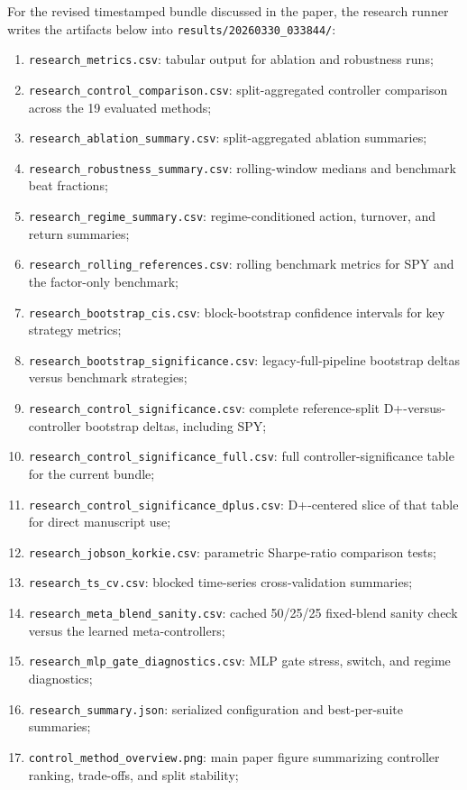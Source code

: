 \documentclass[11pt]{article}
\begin{document}
For the revised timestamped bundle discussed in the paper, the research runner
writes the artifacts below into \texttt{results/20260330\_033844/}:
\begin{enumerate}[leftmargin=1.5em, itemsep=2pt, topsep=4pt]
\item \texttt{research\_metrics.csv}: tabular output for ablation and robustness runs;
\item \texttt{research\_control\_comparison.csv}: split-aggregated controller comparison across the 19 evaluated methods;
\item \texttt{research\_ablation\_summary.csv}: split-aggregated ablation summaries;
\item \texttt{research\_robustness\_summary.csv}: rolling-window medians and benchmark beat fractions;
\item \texttt{research\_regime\_summary.csv}: regime-conditioned action, turnover, and return summaries;
\item \texttt{research\_rolling\_references.csv}: rolling benchmark metrics for SPY and the factor-only benchmark;
\item \texttt{research\_bootstrap\_cis.csv}: block-bootstrap confidence intervals for key strategy metrics;
\item \texttt{research\_bootstrap\_significance.csv}: legacy-full-pipeline bootstrap deltas versus benchmark strategies;
\item \texttt{research\_control\_significance.csv}: complete reference-split D+-versus-controller bootstrap deltas, including SPY;
\item \texttt{research\_control\_significance\_full.csv}: full controller-significance table for the current bundle;
\item \texttt{research\_control\_significance\_dplus.csv}: D+-centered slice of that table for direct manuscript use;
\item \texttt{research\_jobson\_korkie.csv}: parametric Sharpe-ratio comparison tests;
\item \texttt{research\_ts\_cv.csv}: blocked time-series cross-validation summaries;
\item \texttt{research\_meta\_blend\_sanity.csv}: cached 50/25/25 fixed-blend sanity check versus the learned meta-controllers;
\item \texttt{research\_mlp\_gate\_diagnostics.csv}: MLP gate stress, switch, and regime diagnostics;
\item \texttt{research\_summary.json}: serialized configuration and best-per-suite summaries;
\item \texttt{control\_method\_overview.png}: main paper figure summarizing controller ranking, trade-offs, and split stability;

\end{enumerate}
\end{document}
